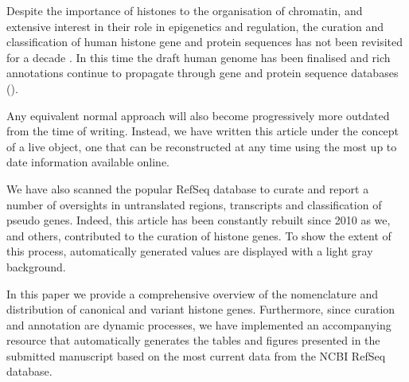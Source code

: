   Despite the importance of histones to the organisation of chromatin, and extensive interest
  in their role in epigenetics and regulation, the curation and classification of human histone
  gene and protein sequences has not been revisited for a decade \citep{Marzluff02}. In this time
  the draft human genome has been finalised and rich annotations continue to propagate through
  gene and protein sequence databases ().

  Any equivalent normal approach will also become progressively more outdated from the
  time of writing. Instead, we have written this article under the concept of a live
  object, one that can be reconstructed at any time using the most up to date information
  available online.

  We have also scanned the popular RefSeq
  database to curate and report a number of oversights in untranslated regions, transcripts and
  classification of pseudo genes. Indeed, this article has been constantly
  rebuilt since 2010 as we, and others, contributed to the curation of histone
  genes.  To show the extent of this process,
  automatically generated values are displayed with a light gray background.

  In this paper we provide a comprehensive overview of the nomenclature and distribution
  of canonical and variant histone genes. Furthermore, since curation and annotation are
  dynamic processes, we have implemented an accompanying resource that automatically generates
  the tables and figures presented in the submitted manuscript based
  on the most current data from the NCBI RefSeq database.

